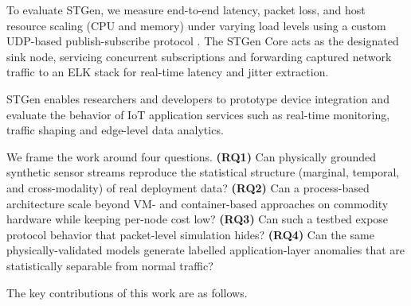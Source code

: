 \documentclass[jsan,article,submit,moreauthors,pdftex]{Definitions/mdpi}
\begin{document}

To evaluate STGen, we measure end-to-end latency, packet loss, and host resource scaling (CPU and memory) under varying load levels using a custom UDP-based publish-subscribe protocol \cite{postel1980rfc768, fotiou2012illustrating}. The STGen Core acts as the designated sink node, servicing concurrent subscriptions and forwarding captured network traffic to an ELK stack \cite{sachdeva2017practical} for real-time latency and jitter extraction.

STGen enables researchers and developers to prototype device integration and evaluate the behavior of {IoT} application services such as real-time monitoring, traffic shaping and edge-level data analytics.

We frame the work around four questions. \textbf{(RQ1)} Can physically grounded synthetic sensor streams reproduce the statistical structure (marginal, temporal, and cross-modality) of real deployment data? \textbf{(RQ2)} Can a process-based architecture scale beyond VM- and container-based approaches on commodity hardware while keeping per-node cost low? \textbf{(RQ3)} Can such a testbed expose protocol behavior that packet-level simulation hides? \textbf{(RQ4)} Can the same physically-validated models generate labelled application-layer anomalies that are statistically separable from normal traffic? 

The key contributions of this work are as follows.
\vspace{.1cm}
\end{document}
